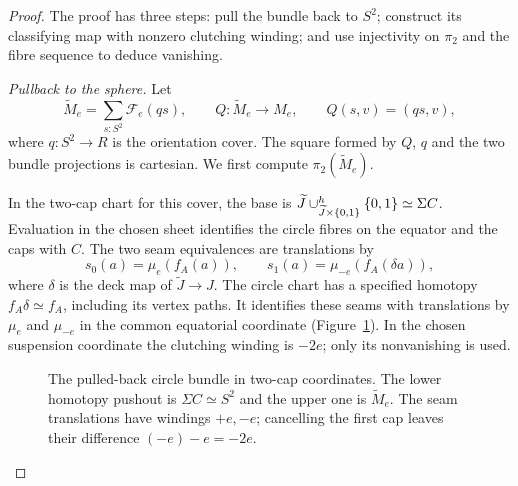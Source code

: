 \begin{proof}
The proof has three steps: pull the bundle back to $S^2$; construct its classifying map with nonzero clutching winding; and use injectivity on $\pi_2$ and the fibre sequence to deduce vanishing.

\emph{Pullback to the sphere.} Let
\[
\widetilde M_e=\sum_{s:S^2}\mathcal F_e(qs),
\qquad Q:\widetilde M_e\longrightarrow M_e,
\qquad Q(s,v)=(qs,v),
\]
where $q:S^2\to R$ is the orientation cover. The square formed by $Q$, $q$ and the two bundle projections is cartesian. We first compute $\pi_2(\widetilde M_e)$.

In the two-cap chart for this cover, the base is
$\widetilde J\mathbin{\cup}^{h}_{\widetilde J\times\{0,1\}}\{0,1\}\simeq\Sigma C$.
Evaluation in the chosen sheet identifies the circle fibres on the equator and the caps with $C$. The two seam equivalences are translations by
\[
s_0(a)=\mu_e(f_A(a)),\qquad
s_1(a)=\mu_{-e}(f_A(\delta a)),
\]
where $\delta$ is the deck map of $\widetilde J\to J$. The circle chart has a specified homotopy $f_A\delta\simeq f_A$, including its vertex paths. It identifies these seams with translations by $\mu_e$ and $\mu_{-e}$ in the common equatorial coordinate (Figure~\ref{fig:two-cap}). In the chosen suspension coordinate the clutching winding is $-2e$; only its nonvanishing is used.

\begin{figure}[htbp]
\centering
{}
\caption{The pulled-back circle bundle in two-cap coordinates. The lower homotopy pushout is $\Sigma C\simeq S^2$ and the upper one is $\widetilde M_e$. The seam translations have windings $+e,-e$; cancelling the first cap leaves their difference $(-e)-e=-2e$.}
\label{fig:two-cap}
\end{figure}


\end{proof}
